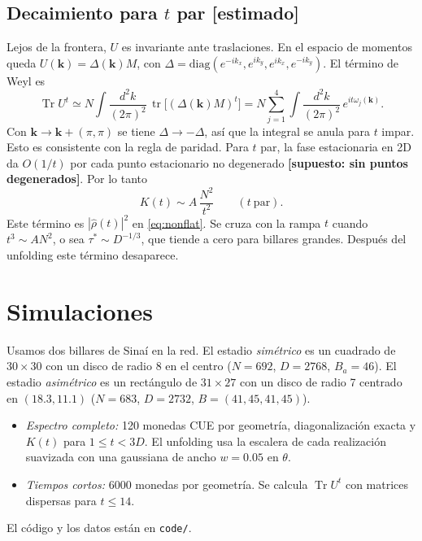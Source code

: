 \documentclass[aps, pra, onecolumn, longbibliography]{revtex4-2}
\newcommand{\Tr}{\operatorname{Tr}}
\begin{document}
\subsection{Decaimiento para $t$ par \textbf{[estimado]}}
Lejos de la frontera, $U$ es invariante ante traslaciones. En el espacio de
momentos queda $U(\mathbf k)=\Delta(\mathbf k)M$, con
$\Delta=\mathrm{diag}(e^{-ik_x},e^{ik_y},e^{ik_x},e^{-ik_y})$. El término de
Weyl es
\begin{equation}
    \Tr U^t\simeq N\!\int\!\frac{d^2k}{(2\pi)^2}\,\operatorname{tr}\bigl[(\Delta(\mathbf k)M)^t\bigr]
    =N\sum_{j=1}^{4}\int\!\frac{d^2k}{(2\pi)^2}\,e^{it\omega_j(\mathbf k)} .
\end{equation}
Con $\mathbf k\to\mathbf k+(\pi,\pi)$ se tiene $\Delta\to-\Delta$, así que la
integral se anula para $t$ impar. Esto es consistente con la regla de paridad.
Para $t$ par, la fase estacionaria en 2D da $O(1/t)$ por cada punto
estacionario no degenerado \textbf{[supuesto: sin puntos degenerados]}. Por lo
tanto
\begin{equation}
    K(t)\sim A\,\frac{N^2}{t^2}\qquad(t\ \text{par}).
\end{equation}
Este término es $|\hat\rho(t)|^2$ en \eqref{eq:nonflat}. Se cruza con la rampa
$t$ cuando $t^3\sim AN^2$, o sea $\tau^*\sim D^{-1/3}$, que tiende a cero para
billares grandes. Después del unfolding este término desaparece.

\section{Simulaciones}

Usamos dos billares de Sinaí en la red. El estadio \emph{simétrico} es un
cuadrado de $30\times30$ con un disco de radio 8 en el centro ($N=692$,
$D=2768$, $B_a=46$). El estadio \emph{asimétrico} es un rectángulo de
$31\times27$ con un disco de radio 7 centrado en $(18.3,11.1)$ ($N=683$,
$D=2732$, $B=(41,45,41,45)$).
\begin{itemize}
    \item \emph{Espectro completo:} 120 monedas CUE por geometría,
    diagonalización exacta y $K(t)$ para $1\le t<3D$. El unfolding usa la
    escalera de cada realización suavizada con una gaussiana de ancho
    $w=0.05$ en $\theta$.
    \item \emph{Tiempos cortos:} 6000 monedas por geometría. Se calcula
    $\Tr U^t$ con matrices dispersas para $t\le14$.
\end{itemize}
El código y los datos están en \texttt{code/}.
\end{document}
